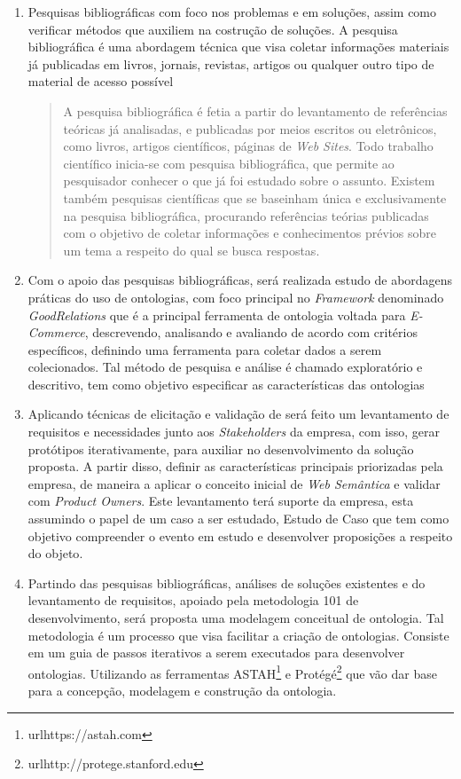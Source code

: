 	\begin{enumerate}
	\item{Pesquisas bibliográficas com foco nos problemas e em soluções, assim como verificar métodos que auxiliem na costrução de soluções. A pesquisa bibliográfica é uma abordagem técnica que visa coletar informações materiais já publicadas em livros, jornais, revistas, artigos ou qualquer outro tipo de material de acesso possível\cite{gil:2008}}

		\begin{quote} A pesquisa bibliográfica é fetia a partir do levantamento de referências teóricas já analisadas, e publicadas por meios escritos ou eletrônicos, como livros, artigos científicos, páginas de \textit{Web Sites}. Todo trabalho científico inicia-se com pesquisa 				bibliográfica, que permite ao pesquisador conhecer o que já foi estudado sobre o assunto. Existem também pesquisas científicas que se baseinham única e exclusivamente na pesquisa bibliográfica, procurando referências teórias publicadas com o objetivo de 				coletar informações e conhecimentos prévios sobre um tema a respeito do qual se busca respostas\cite{fonseca:2002}.
		\end{quote}
	\item{Com o apoio das pesquisas bibliográficas, será realizada estudo de abordagens práticas do uso de ontologias, com foco principal no \textit{Framework} denominado \textit{GoodRelations} que é a principal ferramenta de ontologia voltada para \textit{E-Commerce}, descrevendo, analisando e avaliando de acordo com critérios específicos, definindo uma ferramenta para coletar dados a serem colecionados. Tal método de pesquisa e análise é chamado exploratório e descritivo, tem como objetivo especificar as características das ontologias \cite{gil:2008}}
	\item{Aplicando técnicas de elicitação e validação de será feito um levantamento de requisitos e necessidades junto aos \textit{Stakeholders} da empresa, com isso, gerar protótipos iterativamente, para auxiliar no desenvolvimento da solução proposta. A partir disso, definir as características principais priorizadas pela empresa, de maneira a aplicar o conceito inicial de \textit{Web Semântica} e validar com \textit{Product Owners}. Este levantamento terá suporte da empresa, esta assumindo o papel de um caso a ser estudado, Estudo de Caso que tem como objetivo compreender o evento em estudo e desenvolver proposições a respeito do objeto\cite{gil:2008}.}
	\item{Partindo das pesquisas bibliográficas, análises de soluções existentes e do levantamento de requisitos, apoiado pela metodologia 101 de desenvolvimento, será proposta uma modelagem conceitual de ontologia. Tal metodologia é um processo que visa facilitar a criação de ontologias. Consiste em um guia de passos iterativos a serem executados para desenvolver ontologias\cite{rautenberg:2010}. Utilizando as ferramentas ASTAH\footnote{url{https://astah.com}} e Protégé\footnote{url{http://protege.stanford.edu}} que vão dar base para a concepção, modelagem e construção da ontologia.}

\end{enumerate}
